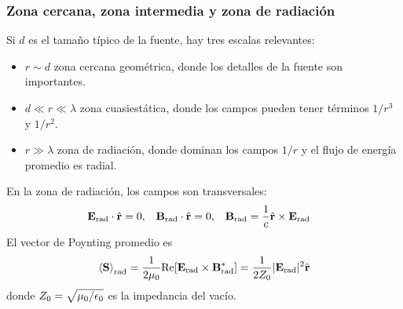 \documentclass[]{article}
\numberwithin{equation}{section}
\begin{document}
\subsubsection{Zona cercana, zona intermedia y zona de radiación}
Si $d$ es el tamaño típico de la fuente, hay tres escalas relevantes:
\begin{itemize}
	\item $r \sim d$ zona cercana geométrica, donde los detalles de la fuente son importantes.
	\item $d \ll r \ll \lambda$ zona cuasiestática, donde los campos pueden tener términos $1/r^3$ y $1/r^2$.
	\item $r \gg \lambda$ zona de radiación, donde dominan los campos $1/r$ y el flujo de energía promedio es radial.
\end{itemize}

En la zona de radiación, los campos son transversales:
\begin{align}
	\mathbf{E}_\mathrm{rad} \cdot \hat{\mathbf{r}} &= 0, & \mathbf{B}_\mathrm{rad} \cdot \hat{\mathbf{r}} &= 0, & \mathbf{B}_\mathrm{rad} &= \frac{1}{c} \hat{\mathbf{r}}\times\mathbf{E}_\mathrm{rad}
\end{align}
El vector de Poynting promedio es
\begin{equation}
	\left\langle \mathbf{S} \right\rangle_\mathrm{rad} = \frac{1}{2\mu_{0}} \mathrm{Re}\!\left[\mathbf{E}_\mathrm{rad}\times\mathbf{B}_\mathrm{rad}^*\right] = \frac{1}{2 Z_0} |\mathbf{E}_\mathrm{rad}|^2 \hat{\mathbf{r}}
\end{equation}
donde $Z_0 = \sqrt{\mu_{0}/\epsilon_{0}}$ es la impedancia del vacío.
\end{document}

